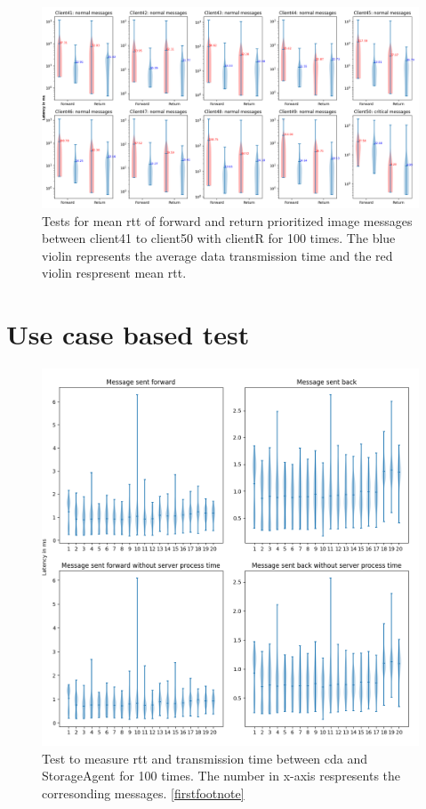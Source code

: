 \begin{figure}
    \includegraphics[width=\textheight]{figures/appendix/priority_tests/log_violin_50clients_image_figure_5.png}\hfill 
    \caption{Tests for mean \gls{rtt} of forward and return prioritized image messages between client41 to client50 
    with clientR for 100 times. The blue violin represents the average data transmission time and the red violin 
    respresent mean \gls{rtt}.} \label{fig: priority-50clients-image-e}
\end{figure}




\section{Use case based test}\label{chap: append-UC}

\begin{figure}[htb]
    \includegraphics[width=\textwidth]{figures/appendix/usecase/violin_CoordinatorAgent_to_StorageAgent.png}
    \centering
    \caption{Test to measure \gls{rtt} and transmission time between \gls{cda} and 
    StorageAgent for 100 times. The number in x-axis respresents the 
    corresonding messages. \protect\ref{firstfootnote}}
    \label{fig: violin-CDA-ST}
\end{figure}


